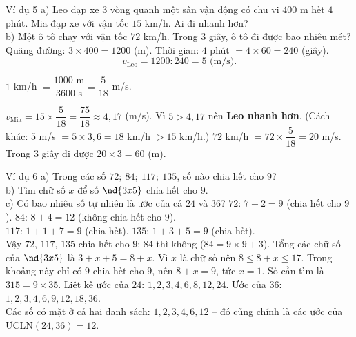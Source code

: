 \begin{exbox}{Ví dụ 5}
a) Leo đạp xe $3$ vòng quanh một sân vận động có chu vi $400$ m hết $4$ phút. Mia đạp xe với vận tốc $15$ km/h.
Ai đi nhanh hơn?\\
b) Một ô tô chạy với vận tốc $72$ km/h. Trong $3$ giây, ô tô đi được bao nhiêu mét?
\guide
{}
Quãng đường: $3 \times 400 = 1200$ (m). Thời gian: $4$ phút $= 4\times 60 = 240$ (giây).
\[ v_{\text{Leo}} = 1200 : 240 = 5 \text{ (m/s)}. \]
\begin{recallbox}$1$ km/h $= \dfrac{1000 \text{ m}}{3600 \text{ s}} = \dfrac{5}{18}$ m/s.\end{recallbox}
$v_{\text{Mia}} = 15 \times \dfrac{5}{18} = \dfrac{75}{18} \approx 4{,}17$ (m/s). Vì $5 > 4{,}17$ nên \textbf{Leo nhanh hơn}.
(Cách khác: $5$ m/s $= 5\times 3{,}6 = 18$ km/h $> 15$ km/h.)
$72$ km/h $= 72 \times \dfrac{5}{18} = 20$ m/s. Trong $3$ giây đi được $20 \times 3 = 60$ (m).
\end{exbox}

\begin{exbox}{Ví dụ 6}
a) Trong các số $72;\ 84;\ 117;\ 135$, số nào chia hết cho $9$?\\
b) Tìm chữ số $x$ để số $\nd{3x5}$ chia hết cho $9$.\\
c) Có bao nhiêu số tự nhiên là ước của cả $24$ và $36$?
\guide
{}
$72$: $7+2 = 9$ (chia hết cho $9$). \quad $84$: $8 + 4 = 12$ (không chia hết cho $9$).\\
$117$: $1+1+7 = 9$ (chia hết). \quad $135$: $1+3+5 = 9$ (chia hết).\\
Vậy $72$, $117$, $135$ chia hết cho $9$; $84$ thì không ($84 = 9\times 9 + 3$).
Tổng các chữ số của $\nd{3x5}$ là $3 + x + 5 = 8 + x$. Vì $x$ là chữ số nên $8 \le 8 + x \le 17$. Trong khoảng này chỉ có
$9$ chia hết cho $9$, nên $8 + x = 9$, tức $x = 1$. Số cần tìm là $315 = 9 \times 35$.
Liệt kê ước của $24$: $1, 2, 3, 4, 6, 8, 12, 24$. Ước của $36$: $1, 2, 3, 4, 6, 9, 12, 18, 36$.\\
Các số có mặt ở cả hai danh sách: $1, 2, 3, 4, 6, 12$ -- đó cũng chính là các ước của ƯCLN$(24,36) = 12$.
\end{exbox}

